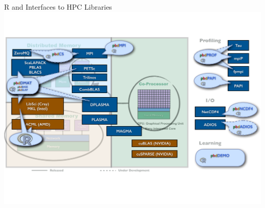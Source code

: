 \begin{frame}{R and \pbdR Interfaces to HPC Libraries}
\includegraphics[height=\textheight]
{../common/pics/hardware/ParallelHardware27.pdf}
\end{frame}

